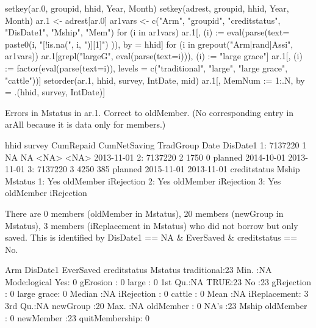 \begin{Schunk}
\begin{Sinput}
setkey(ar.0, groupid, hhid, Year, Month)
setkey(adrest, groupid, hhid, Year, Month)
ar.1 <- adrest[ar.0]
ar1vars <- c("Arm", "groupid", "creditstatus", "DisDate1", "Mship", "Mem")
for (i in ar1vars)
  ar.1[, (i) := eval(parse(text=
      paste0(i, "[!is.na(", i, ")][1]")
    )), by = hhid]
for (i in grepout("Arm|rand|Assi", ar1vars)) {
  ar.1[grepl("largeG", eval(parse(text=i))), (i) := "large grace"]
  ar.1[, (i) := factor(eval(parse(text=i)), 
    levels = c("traditional", "large", "large grace", "cattle"))]
}
setorder(ar.1, hhid, survey, IntDate, mid)
ar.1[, MemNum := 1:.N, by = .(hhid, survey, IntDate)]
\end{Sinput}
\end{Schunk}
Errors in \textsf{Mstatus} in \textsf{ar.1}. Correct to oldMember. (No corresponding entry in \textsf{arAll} because it is data only for members.)
\begin{Schunk}
\begin{Soutput}
      hhid survey CumRepaid CumNetSaving TradGroup       Date   DisDate1
1: 7137220      1        NA           NA      <NA>       <NA> 2013-11-01
2: 7137220      2      1750            0   planned 2014-10-01 2013-11-01
3: 7137220      3      4250          385   planned 2015-11-01 2013-11-01
   creditstatus     Mship    Mstatus
1:          Yes oldMember iRejection
2:          Yes oldMember iRejection
3:          Yes oldMember iRejection
\end{Soutput}
\end{Schunk}
There are
0 members (\textsf{oldMember} in \textsf{Mstatus}), 
20 members (\textsf{newGroup} in \textsf{Mstatus}),
3 
members (\textsf{iReplacement} in \textsf{Mstatus}) who did not borrow but only saved. This is identified by \textsf{DisDate1} == NA \&  \textsf{EverSaved} \& \textsf{creditstatus} == No.  
\begin{Schunk}
\begin{Soutput}
          Arm        DisDate1  EverSaved      creditstatus         Mstatus  
 traditional:23   Min.   :NA   Mode:logical   Yes: 0       gErosion    : 0  
 large      : 0   1st Qu.:NA   TRUE:23        No :23       gRejection  : 0  
 large grace: 0   Median :NA                               iRejection  : 0  
 cattle     : 0   Mean   :NA                               iReplacement: 3  
                  3rd Qu.:NA                               newGroup    :20  
                  Max.   :NA                               oldMember   : 0  
                  NA's   :23                                                
            Mship   
 oldMember     : 0  
 newMember     :23  
 quitMembership: 0  
                    
                    
                    
                    
\end{Soutput}
\end{Schunk}
